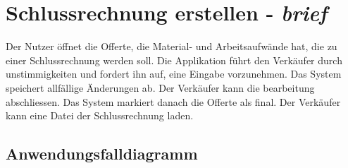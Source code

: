 \documentclass[a4paper,12pt]{article}
\begin{document}
	\section{Schlussrechnung erstellen - \emph{brief}}
		Der Nutzer öffnet die Offerte, die Material- und Arbeitsaufwände hat,
		die zu einer Schlussrechnung werden soll. Die Applikation führt den Verkäufer durch
		unstimmigkeiten und fordert ihn auf, eine Eingabe vorzunehmen. Das System
		speichert allfällige Änderungen ab. Der Verkäufer kann die bearbeitung abschliessen.
		Das System markiert danach die Offerte als final. Der Verkäufer kann eine Datei der 
		Schlussrechnung laden.

	\newpage
	\subsection{Anwendungsfalldiagramm}
	\begin{center}
	\end{center}

	\newpage
\end{document}
